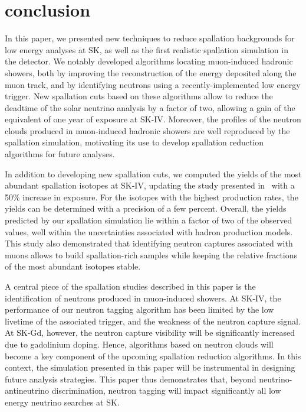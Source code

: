\section{conclusion}
\label{sec:conclusion}
In this paper, we presented new techniques to reduce spallation backgrounds for low energy analyses at SK, as well as the first realistic spallation simulation in the detector. We notably developed algorithms locating muon-induced hadronic showers, both by improving the reconstruction of the energy deposited along the muon track, and by identifying neutrons using a recently-implemented low energy trigger. New spallation cuts based on these algorithms allow to reduce the deadtime of the solar neutrino analysis by a factor of two, allowing a gain of the equivalent of one year of exposure at SK-IV. Moreover, the profiles of the neutron clouds produced in muon-induced hadronic showers are well reproduced by the spallation simulation, motivating its use to develop spallation reduction algorithms for future analyses. 

In addition to developing new spallation cuts, we computed the yields of the most abundant spallation isotopes at SK-IV, updating the study presented in~\cite{SKspall_zhang} with a 50\% increase in exposure. For the isotopes with the highest production rates, the yields can be determined with a precision of a few percent. Overall, the yields predicted by our spallation simulation lie within a factor of two of the observed values, well within the uncertainties associated with hadron production models. This study also demonstrated that identifying neutron captures associated with muons allows to build spallation-rich samples while keeping the relative fractions of the most abundant isotopes stable.

A central piece of the spallation studies described in this paper is the identification of neutrons produced in muon-induced showers. At SK-IV, the performance of our neutron tagging algorithm has been limited by the low livetime of the associated trigger, and the weakness of the neutron capture signal. At SK-Gd, however, the neutron capture visibility will be significantly increased due to gadolinium doping. Hence, algorithms based on neutron clouds will become a key component of the upcoming spallation reduction algorithms. In this context, the simulation presented in this paper will be instrumental in designing future analysis strategies. This paper thus demonstrates that, beyond neutrino-antineutrino discrimination, neutron tagging will impact significantly all low energy neutrino searches at SK.

